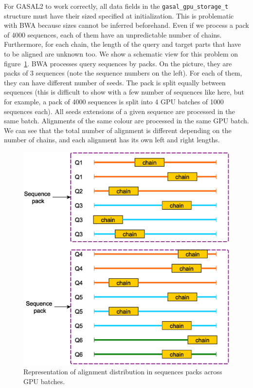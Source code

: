 For GASAL2 to work correctly, all data fields in the \texttt{gasal\_gpu\_storage\_t} structure must have their sized specified at initialization. This is problematic with BWA because sizes cannot be inferred beforehand. Even if we process a pack of 4000 sequences, each of them have an unpredictable number of chains. Furthermore, for each chain, the length of the query and target parts that have to be aligned are unknown too. We show a schematic view for this problem on figure~\ref{fig:cpu-gpu-batches}. BWA processes query sequences by packs. On the picture, they are packs of 3 sequences (note the sequence numbers on the left). For each of them, they can have different number of seeds. The pack is split equally between sequences (this is difficult to show with a few number of sequences like here, but for example, a pack of 4000 sequences is split into 4 GPU batches of 1000 sequences each). All seeds extensions of a given sequence are processed in the same batch. Alignments of the same colour are processed in the same GPU batch. We can see that the total number of alignment is different depending on the number of chains, and each alignment has its own left and right lengths.

\begin{figure}[h!]
	\centering
	\includegraphics[width=1\linewidth]{cpu-gpu-batches}
	\caption{Representation of alignment distribution in sequences packs across GPU batches.}
	\label{fig:cpu-gpu-batches}
\end{figure}


